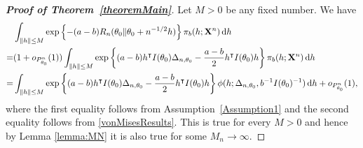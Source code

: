 \documentclass[11pt]{article}
\newcommand{\myT}{\intercal}
\theoremstyle{plain}
\theoremstyle{definition}
\theoremstyle{remark}
\begin{document}
\begin{appendices}
\begin{proof}[\textbf{Proof of Theorem~\ref{theoremMain}}]
    Let $M>0$ be any fixed number.
    We have
\begin{equation}\label{eq:8}
    \begin{split}
    &\int_{\|h\|\leq M} 
    \exp\left\{ - (a-b) R_n ( \theta_0 \| \theta_0 + n^{-1/2} h ) \right\}
    \pi_b (h;\BX^{n}) \, \mathrm dh\\
    =&
    ( 1 + o_{P^n_{\theta_0}}(1) )\int_{\|h\|\leq M} \exp\left\{ (a-b) h^\myT  I(\theta_0)\Delta_{n,\theta_0}- \frac{a-b}{2}h^\myT  I(\theta_0) h \right\}\pi_b (h;\BX^{n}) \, \mathrm dh
    \\
    =&\int_{\|h\|\leq M} \exp \left\{ (a-b) h^\myT  I(\theta_0)\Delta_{n,\theta_0}-\frac{a-b}{2}h^\myT  I(\theta_0) h \right\} \phi(h;\Delta_{n,\theta_0}, b^{-1} I(\theta_0)^{-1})\, \mathrm dh
    +o_{P^n_{\theta_0}}(1),
\end{split}
\end{equation}
where the first equality follows from Assumption~\ref{Assumption1} and the second equality follows from \eqref{vonMisesResults}.
This is true for every $M>0$ and hence by Lemma \ref{lemma:MN} it is also true for some $M_n\to \infty$.


\end{proof}
\end{appendices}
\end{document}
